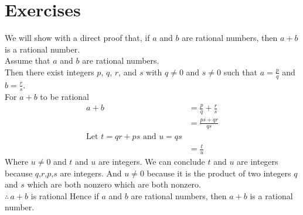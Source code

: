 \documentclass[12pt letter]{report}
\begin{document}
\section{Exercises}



\begin{myproof}
	We will show with a direct proof that, if $a$ and $b$ are rational numbers, then $a + b$ is a rational number. \\
	Assume that $a$ and $b$ are rational numbers. \\
	Then there exist integers $p$, $q$, $r$, and $s$ with $q \neq 0$ and $s \neq 0$ such that $a = \frac{p}{q}$ and $b =
		\frac{r}{s}$.\\
	For $a + b$ to be rational
	\begin{align*}
		a + b & = \frac{p}{q} + \frac{r}{s}  \\
		      & = \frac{ps + qr}{qs}         \\
		\text{Let $t =qr + ps$ and $u = qs$} \\
		      & = \frac{t}{u}
	\end{align*}
	Where $u \neq 0$ and $t$ and $u$ are integers. We can conclude $t$ and $u$ are integers because $q$,$r$,$p$,$s$ are
	integers. And $u\neq 0$ because it is the product of two integers $q$ and $s$ which are both nonzero which are both
	nonzero.\\
	$\therefore \, a + b$ is rational
	Hence if $a$ and $b$ are rational numbers, then $a + b$ is a rational number.
\end{myproof}

\end{document}
